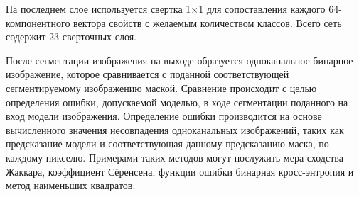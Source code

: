 На последнем слое используется свертка 1×1 для сопоставления каждого 64-компонентного вектора свойств с желаемым количеством классов. Всего сеть содержит 23 сверточных слоя.

После сегментации изображения на выходе образуется одноканальное бинарное изображение, которое сравнивается с поданной соответствующей сегментируемому изображению маской. Сравнение происходит с целью определения ошибки, допускаемой моделью, в ходе сегментации поданного на вход модели изображения. Определение ошибки производится на основе вычисленного значения несовпадения одноканальных изображений, таких как предсказание модели и соответствующая данному предсказанию маска, по каждому пикселю. Примерами таких методов могут послужить мера сходства Жаккара, коэффициент Сёренсена, функции ошибки бинарная кросс-энтропия и метод наименьших квадратов.
